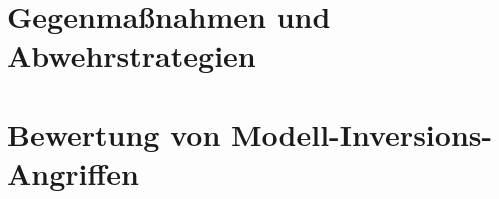 \section{Gegenmaßnahmen und Abwehrstrategien}\label{chpt:DefenseMI}
\section{Bewertung von Modell-Inversions-Angriffen}
